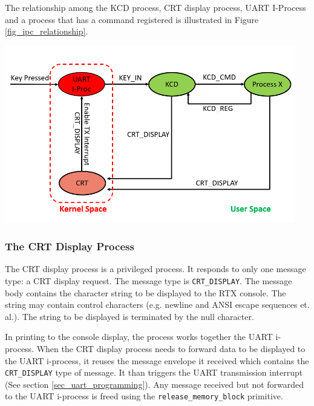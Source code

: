 \begin{itemize}
  The relationship among the KCD process, CRT display process, UART I-Process and a process that has a command registered is illustrated in Figure \ref{fig_ipc_relationship}.

          \begin{minipage}{\linewidth}
            \centering
            \includegraphics[width=5in]{figure/ipc/ipc_relationship}
            \label{fig_ipc_relationship}
          \end{minipage}
  
\end{itemize}

\subsubsection{The CRT Display Process}
\label{sec_crt}
The CRT display process is a privileged process. It responds to only one message type: a CRT display request. The message type is \verb+CRT_DISPLAY+. The message body contains the character string to be displayed to the RTX console. The string may contain control characters (e.g. newline and ANSI escape sequences et. al.). The string to be displayed is terminated by the null character.


In printing to the console display, the process works together the UART i-process. When the CRT display process needs to forward data to be displayed to the UART i-process, it reuses the message envelope it received which contains the \verb+CRT_DISPLAY+ type of message. It than triggers the UART transmission interrupt (See section \ref{sec_uart_programming}). Any message received but not forwarded to the UART i-process is freed using the \verb+release_memory_block+ primitive.

